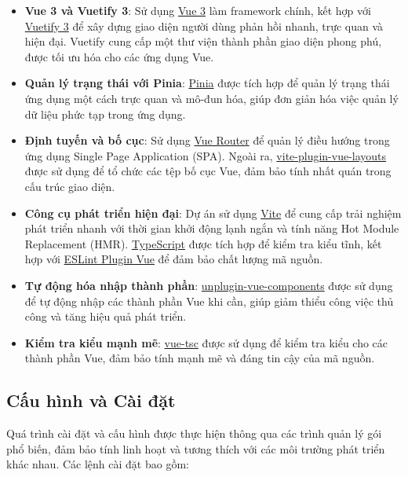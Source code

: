 \begin{itemize}
    \item \textbf{Vue 3 và Vuetify 3}: Sử dụng \href{https://vuejs.org/}{Vue 3} làm framework chính, kết hợp với \href{https://vuetifyjs.com/}{Vuetify 3} để xây dựng giao diện người dùng phản hồi nhanh, trực quan và hiện đại. Vuetify cung cấp một thư viện thành phần giao diện phong phú, được tối ưu hóa cho các ứng dụng Vue.
    \item \textbf{Quản lý trạng thái với Pinia}: \href{https://pinia.vuejs.org/}{Pinia} được tích hợp để quản lý trạng thái ứng dụng một cách trực quan và mô-đun hóa, giúp đơn giản hóa việc quản lý dữ liệu phức tạp trong ứng dụng.
    \item \textbf{Định tuyến và bố cục}: Sử dụng \href{https://router.vuejs.org/}{Vue Router} để quản lý điều hướng trong ứng dụng Single Page Application (SPA). Ngoài ra, \href{https://github.com/JohnCampionJr/vite-plugin-vue-layouts}{vite-plugin-vue-layouts} được sử dụng để tổ chức các tệp bố cục Vue, đảm bảo tính nhất quán trong cấu trúc giao diện.
    \item \textbf{Công cụ phát triển hiện đại}: Dự án sử dụng \href{https://vitejs.dev/}{Vite} để cung cấp trải nghiệm phát triển nhanh với thời gian khởi động lạnh ngắn và tính năng Hot Module Replacement (HMR). \href{https://www.typescriptlang.org/}{TypeScript} được tích hợp để kiểm tra kiểu tĩnh, kết hợp với \href{https://eslint.vuejs.org/}{ESLint Plugin Vue} để đảm bảo chất lượng mã nguồn.
    \item \textbf{Tự động hóa nhập thành phần}: \href{https://github.com/antfu/unplugin-vue-components}{unplugin-vue-components} được sử dụng để tự động nhập các thành phần Vue khi cần, giúp giảm thiểu công việc thủ công và tăng hiệu quả phát triển.
    \item \textbf{Kiểm tra kiểu mạnh mẽ}: \href{https://github.com/johnsoncodehk/volar/tree/master/packages/vue-tsc}{vue-tsc} được sử dụng để kiểm tra kiểu cho các thành phần Vue, đảm bảo tính mạnh mẽ và đáng tin cậy của mã nguồn.
\end{itemize}

\subsection*{Cấu hình và Cài đặt}

Quá trình cài đặt và cấu hình được thực hiện thông qua các trình quản lý gói phổ biến, đảm bảo tính linh hoạt và tương thích với các môi trường phát triển khác nhau. Các lệnh cài đặt bao gồm:

